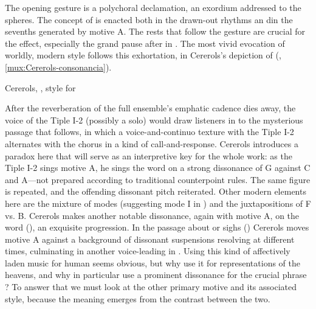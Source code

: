 The opening gesture is a polychoral declamation, an exordium addressed to the
spheres.
The concept of  is enacted both in the drawn-out rhythms an
din the sevenths generated by motive A.
The rests that follow the gesture are crucial for the effect, especially the
grand pause after  in .
The most vivid evocation of worldly, modern style follows this exhortation, in
Cererols's depiction of  (,
\cref{mux:Cererols-consonancia}).

\begin{musicexample}
    \caption{Cererols, ,  style for
    }
    \label{mux:Cererols-consonancias}
\end{musicexample}

After the reverberation of the full ensemble's emphatic cadence dies away, the
voice of the Tiple I-2 (possibly a solo) would draw listeners in to the
mysterious passage that follows, in which a voice-and-continuo texture with the
Tiple I-2 alternates with the chorus in a kind of call-and-response.
Cererols introduces a paradox here that will serve as an interpretive key for
the whole work: as the Tiple I-2 sings motive A, he sings the word
 on a strong dissonance of G against C\sh{} and A---not
prepared according to traditional counterpoint rules.
The same figure is repeated, and the offending dissonant pitch reiterated.
Other modern elements here are the mixture of modes (suggesting mode I in
) and the juxtapositions of F\sh{} vs. B\fl{}.
Cererols makes another notable dissonance, again with motive A, on the word
 (), an exquisite 
progression.
In the passage about  or sighs () Cererols
moves motive A against a background of dissonant suspensions resolving at
different times, culminating in another voice-leading  in
.
Using this kind of affectively laden music for human  seems
obvious, but why use it for representations of the heavens, and why in
particular use a prominent dissonance for the crucial phrase ?
To answer that we must look at the other primary motive and its associated
style, because the meaning emerges from the contrast between the two.


\endinput

